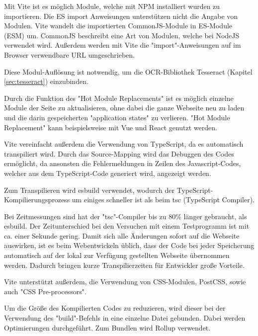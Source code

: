 

Mit Vite ist es möglich Module, welche mit NPM installiert wurden zu importieren. Die ES import Anweisungen unterstützen nicht die Angabe von Modulen. Vite wandelt die importierten CommonJS-Module in ES-Module (ESM) um. CommonJS beschreibt eine Art von Modulen, welche bei NodeJS verwendet wird. Außerdem werden mit Vite die "import"-Anweisungen auf im Browser verwendbare URL umgeschrieben. \cite{ViteFeatures}


Diese Modul-Auflösung ist notwendig, um die OCR-Bibliothek Tesseract (Kapitel \ref{sec:tesseract}) einzubinden. 


Durch die Funktion des "Hot Module Replacements" ist es möglich einzelne Module der Seite zu aktualisieren, ohne dabei die ganze Webseite neu zu laden und die darin gespeicherten "application states" zu verlieren. "Hot Module Replacement" kann beispielsweise mit Vue und React genutzt werden. \cite{ViteFeatures}
  

Vite vereinfacht außerdem die Verwendung von TypeScript, da es automatisch transpiliert wird. 
Durch das Source-Mapping wird das Debuggen des Codes ermöglicht, da ansonsten die Fehlermeldungen in Zeilen des Javascript-Codes, welcher aus dem TypeScript-Code generiert wird, angezeigt werden. 

Zum Transpilieren wird esbuild\cite{esbuild} verwendet, wodurch der TypeScript-Kompilierungsprozess um einiges schneller ist als beim tsc (TypeScript Compiler). \cite{ViteFeatures}

Bei Zeitmessungen sind hat der "tsc"-Compiler bis zu 80\% länger gebraucht, als esbuild. Der Zeitunterschied bei den Versuchen mit einem Testprogramm ist mit ca. einer Sekunde gering. Damit sich alle Änderungen sofort auf die Webseite auswirken, ist es beim Webentwickeln üblich, dass der Code bei jeder Speicherung automatisch auf der lokal zur Verfügung gestellten Webseite übernommen werden. Dadurch bringen kurze Transpilierzeiten für Entwickler große Vorteile. 


Vite unterstützt außerdem, die Verwendung von CSS-Modulen, PostCSS, sowie auch "CSS Pre-processors". \cite{ViteFeatures}


Um die Größe des Kompilierten Codes zu reduzieren, wird dieser bei der Verwendung des "build"-Befehls in eine einzelne Datei gebunden. Dabei werden Optimierungen durchgeführt. Zum Bundlen wird Rollup \cite{Rollup} verwendet.




